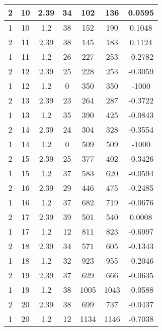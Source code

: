 \documentclass[letterpaper, 12pt]{article}
\begin{document}
\begin{longtable}{|c|c|c|c|c|c|c|}
\hline
2 & 10 & 2.39 & 34 & 102 & 136 & 0.0595 \\
\hline
1 & 10 & 1.2 & 38 & 152 & 190 & 0.1048 \\
\hline
2 & 11 & 2.39 & 38 & 145 & 183 & 0.1124 \\
\hline
1 & 11 & 1.2 & 26 & 227 & 253 & -0.2782 \\
\hline
2 & 12 & 2.39 & 25 & 228 & 253 & -0.3059 \\
\hline
1 & 12 & 1.2 & 0 & 350 & 350 & -1000 \\
\hline
2 & 13 & 2.39 & 23 & 264 & 287 & -0.3722 \\
\hline
1 & 13 & 1.2 & 35 & 390 & 425 & -0.0843 \\
\hline
2 & 14 & 2.39 & 24 & 304 & 328 & -0.3554 \\
\hline
1 & 14 & 1.2 & 0 & 509 & 509 & -1000 \\
\hline
2 & 15 & 2.39 & 25 & 377 & 402 & -0.3426 \\
\hline
1 & 15 & 1.2 & 37 & 583 & 620 & -0.0594 \\
\hline
2 & 16 & 2.39 & 29 & 446 & 475 & -0.2485 \\
\hline
1 & 16 & 1.2 & 37 & 682 & 719 & -0.0676 \\
\hline
2 & 17 & 2.39 & 39 & 501 & 540 & 0.0008 \\
\hline
1 & 17 & 1.2 & 12 & 811 & 823 & -0.6997 \\
\hline
2 & 18 & 2.39 & 34 & 571 & 605 & -0.1343 \\
\hline
1 & 18 & 1.2 & 32 & 923 & 955 & -0.2046 \\
\hline
2 & 19 & 2.39 & 37 & 629 & 666 & -0.0635 \\
\hline
1 & 19 & 1.2 & 38 & 1005 & 1043 & -0.0588 \\
\hline
2 & 20 & 2.39 & 38 & 699 & 737 & -0.0437 \\
\hline
1 & 20 & 1.2 & 12 & 1134 & 1146 & -0.7038 \\
\hline
\end{longtable}
\end{document}
